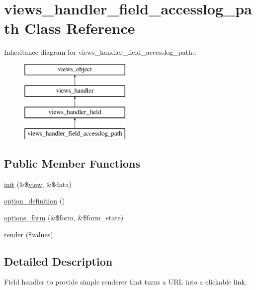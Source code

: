 \hypertarget{classviews__handler__field__accesslog__path}{
\section{views\_\-handler\_\-field\_\-accesslog\_\-path Class Reference}
\label{classviews__handler__field__accesslog__path}
}
Inheritance diagram for views\_\-handler\_\-field\_\-accesslog\_\-path::\begin{figure}[H]
\begin{center}
\leavevmode
\includegraphics[height=4cm]{classviews__handler__field__accesslog__path}
\end{center}
\end{figure}
\subsection*{Public Member Functions}
\begin{CompactItemize}
\item 
\hyperlink{classviews__handler__field__accesslog__path_6b5a912fcf95a0f2f26d823be47d760e}{init} (\&\$\hyperlink{classview}{view}, \&\$data)
\item 
\hyperlink{classviews__handler__field__accesslog__path_11c091160e8e55c604aeb1241581f748}{option\_\-definition} ()
\item 
\hyperlink{classviews__handler__field__accesslog__path_b8bfda464a205057cd730081aa5981c8}{options\_\-form} (\&\$form, \&\$form\_\-state)
\item 
\hyperlink{classviews__handler__field__accesslog__path_b40b3461a6c122c052753537346089b1}{render} (\$values)
\end{CompactItemize}


\subsection{Detailed Description}
Field handler to provide simple renderer that turns a URL into a clickable link. 

